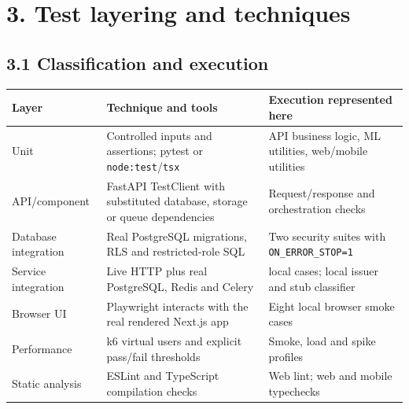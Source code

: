 \documentclass[
  11pt,
]{article}
\newcounter{none} %
\begin{document}
\section{3. Test layering and
techniques}\label{test-layering-and-techniques}

\subsection{3.1 Classification and
execution}\label{classification-and-execution}

{\def\LTcaptype{none} %
\begin{longtable}[]{@{}
  >{\raggedright\arraybackslash}p{}
  >{\raggedright\arraybackslash}p{}
  >{\raggedright\arraybackslash}p{}@{}}
\toprule\noalign{}
\begin{minipage}[b]{\linewidth}\raggedright
Layer
\end{minipage} & \begin{minipage}[b]{\linewidth}\raggedright
Technique and tools
\end{minipage} & \begin{minipage}[b]{\linewidth}\raggedright
Execution represented here
\end{minipage} \\
\midrule\noalign{}
\endhead
\bottomrule\noalign{}
\endlastfoot
Unit & Controlled inputs and assertions; pytest or
\texttt{node:test}/\texttt{tsx} & API business logic, ML utilities,
web/mobile utilities \\
API/component & FastAPI TestClient with substituted database, storage or
queue dependencies & Request/response and orchestration checks \\
Database integration & Real PostgreSQL migrations, RLS and
restricted-role SQL & Two security suites with
\texttt{ON\_ERROR\_STOP=1} \\
Service integration & Live HTTP plus real PostgreSQL, Redis and Celery &
14 local cases; local issuer and stub classifier \\
Browser UI & Playwright interacts with the real rendered Next.js app &
Eight local browser smoke cases \\
Performance & k6 virtual users and explicit pass/fail thresholds &
Smoke, load and spike profiles \\
Static analysis & ESLint and TypeScript compilation checks & Web lint;
web and mobile typechecks \\
\end{longtable}
}
\end{document}
